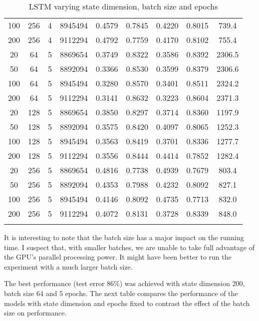 \documentclass[letterpaper, 10pt]{article}
\begin{document}
\begin{longtable}{c | c | c | c | c | c | c | c | c}
100 & 256 & 4 & 8945494 & 0.4579 & 0.7845 & 0.4220 & 0.8015 & 739.4 \\
200 & 256 & 4 & 9112294 & 0.4792 & 0.7759 & 0.4170 & 0.8102 & 755.4 \\
\hline
20 & 64 & 5 & 8869654 & 0.3749 & 0.8322 & 0.3586 & 0.8392 & 2306.5 \\
50 & 64 & 5 & 8892094 & 0.3366 & 0.8530 & 0.3599 & 0.8379 & 2306.6 \\
100 & 64 & 5 & 8945494 & 0.3280 & 0.8570 & 0.3401 & 0.8511 & 2324.2 \\
200 & 64 & 5 & 9112294 & 0.3141 & 0.8632 & 0.3223 & 0.8604 & 2371.3 \\
20 & 128 & 5 & 8869654 & 0.3850 & 0.8297 & 0.3714 & 0.8360 & 1197.9 \\
50 & 128 & 5 & 8892094 & 0.3575 & 0.8420 & 0.4097 & 0.8065 & 1252.3 \\
100 & 128 & 5 & 8945494 & 0.3563 & 0.8419 & 0.3701 & 0.8336 & 1277.7 \\
200 & 128 & 5 & 9112294 & 0.3556 & 0.8444 & 0.4414 & 0.7852 & 1282.4 \\
20 & 256 & 5 & 8869654 & 0.4816 & 0.7738 & 0.4939 & 0.7679 & 803.4 \\
50 & 256 & 5 & 8892094 & 0.4353 & 0.7988 & 0.4232 & 0.8092 & 827.1 \\
100 & 256 & 5 & 8945494 & 0.4146 & 0.8092 & 0.4735 & 0.7713 & 832.0 \\
200 & 256 & 5 & 9112294 & 0.4072 & 0.8131 & 0.3728 & 0.8339 & 848.0 \\
\caption{LSTM varying state dimension, batch size and epochs}
\label{tab:resultslstm}
\end{longtable}

It is interesting to note that the batch size has a major impact on the running time.
I suspect that, with smaller batches, we are unable to take full advantage of the
GPU's parallel processing power. It might have been better to run the experiment
with a much larger batch size.

The best performance (test error 86\%) was achieved with state dimension 200, batch size
64 and 5 epochs. The next table compares the performance of the models with state dimension
and epochs fixed to contrast the effect of the batch size on performance.
\end{document}
